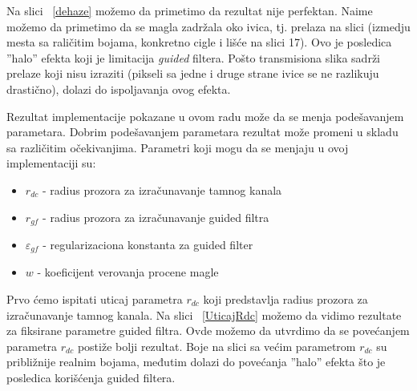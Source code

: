 \documentclass[a4paper,12pt,titlepage]{article}
\begin{document}
Na slici ~\ref{dehaze} možemo da primetimo da rezultat nije perfektan. Naime možemo da primetimo da se magla zadržala oko ivica, tj. prelaza na slici (izmedju mesta sa raličitim bojama, konkretno cigle i lišće na slici 17). Ovo je posledica ''halo'' efekta koji je limitacija \emph{guided} filtera. Pošto transmisiona slika sadrži prelaze koji nisu izraziti (pikseli sa jedne i druge strane ivice se ne razlikuju drastično), dolazi do ispoljavanja ovog efekta.

Rezultat implementacije pokazane u ovom radu može da se menja podešavanjem parametara. Dobrim podešavanjem parametara rezultat može promeni u skladu sa različitim očekivanjima. Parametri koji mogu da se menjaju u ovoj implementaciji su:

\begin{itemize}
\item $r_{dc}$ - radius prozora za izračunavanje tamnog kanala 
\item $r_{gf}$ - radius prozora za izračunavanje guided filtra
\item $\varepsilon_{gf}$ - regularizaciona konstanta za guided filter 
\item $w$ - koeficijent verovanja procene magle
\end{itemize}

Prvo ćemo ispitati uticaj parametra $r_{dc}$ koji predstavlja radius prozora za izračunavanje tamnog kanala. Na slici ~\ref{UticajRdc} možemo da vidimo rezultate za fiksirane parametre guided filtra. Ovde možemo da utvrdimo da se povećanjem parametra $r_{dc}$ postiže bolji rezultat. Boje na slici sa većim parametrom $r_{dc}$ su približnije realnim bojama, međutim dolazi do povećanja ''halo'' efekta što je posledica korišćenja guided filtera.  
\end{document}
